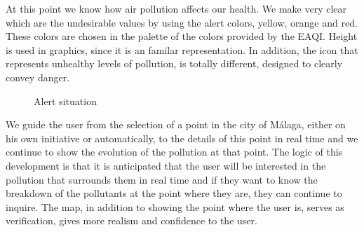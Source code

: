 At this point we know how air pollution affects our health.
We make very clear which are the undesirable values by using the alert colors, yellow, orange and red.
These colors are chosen in the palette of the colors provided by the EAQI.
Height is used in graphics, since it is an familar representation.
In addition, the icon that represents unhealthy levels of pollution, is totally different, designed to clearly convey danger. \\

\begin{figure}[ht]
    \centering
    \hfill
    \caption{Alert situation}
\end{figure}

We guide the user from the selection of a point in the city of Málaga, either on his own initiative
or automatically, to the details of this point in real time and we continue to show the evolution of the pollution at that point.
The logic of this development is that it is anticipated that the user will be interested in the pollution that surrounds them in real time and if
they want to know the breakdown of the pollutants at the point where they are, they can continue to inquire.
The map, in addition to showing the point where the user is, serves as verification, gives more realism and confidence to the user.